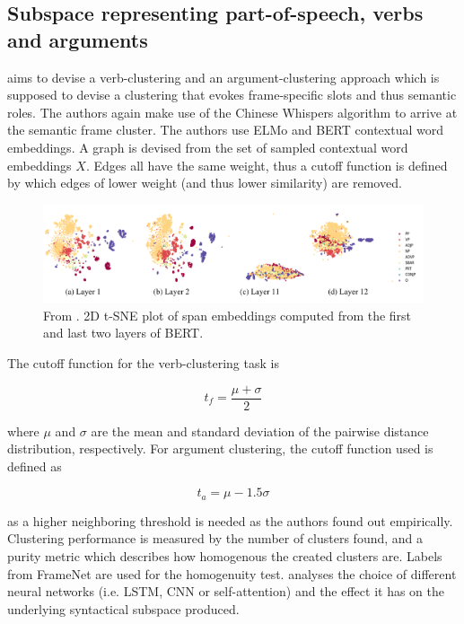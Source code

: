 \documentclass[a4paper,12pt,oneside,openright]{report}
\begin{document}
\subsection{Subspace representing part-of-speech, verbs and arguments}

\cite{ribeiro19} aims to devise a verb-clustering and an argument-clustering approach which is supposed to devise a clustering that evokes frame-specific slots and thus semantic roles.
The authors again make use of the Chinese Whispers algorithm
\cite{biemann06} to arrive at the semantic frame cluster.
The authors use ELMo and BERT contextual word embeddings.
A graph is devised from the set of sampled contextual word embeddings $X$.
Edges all have the same weight, thus a cutoff function is defined by  which edges of lower weight (and thus lower similarity) are removed.

\begin{figure}[H]
	\center
  \includegraphics[width=0.9\linewidth]{./assets/relatedwork/BERT_tsne_layers.png}
  \caption{From \cite{jawahar19}. 2D t-SNE plot of span embeddings computed from the first and last two layers of BERT.}
  \label{fig:cold_fictional_desired}
\end{figure}

The cutoff function for the verb-clustering task is

\begin{equation}
t_f = \frac{\mu + \sigma}{2}
\end{equation}

where $\mu$ and $\sigma$ are the mean and standard deviation of the pairwise distance distribution, respectively. 
For argument clustering, the cutoff function used is defined as

\begin{equation}
t_a = \mu - 1.5 \sigma
\end{equation}

as a higher neighboring threshold is needed as the authors found out empirically.
Clustering performance is measured by the number of clusters found, and a purity metric which describes how homogenous the created clusters are. 
Labels from FrameNet \cite{baker98} are used for the homogenuity test. 
\cite{peters18} analyses the choice of different neural networks (i.e. LSTM, CNN or self-attention) and the effect it has on the underlying syntactical subspace produced. \\
\end{document}
